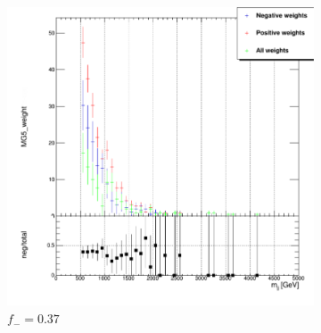 \begin{figure}[t]
\centering
\begin{subfigure}[b]{0.49\textwidth}
    \centering
    \includegraphics[width=\textwidth]{plots/diffx/int_mjj_3.png}
    \caption{$f_-=0.37$}
\end{subfigure}
\hfill
\begin{subfigure}[b]{0.49\textwidth}
    \centering

\end{subfigure}
\end{figure}
